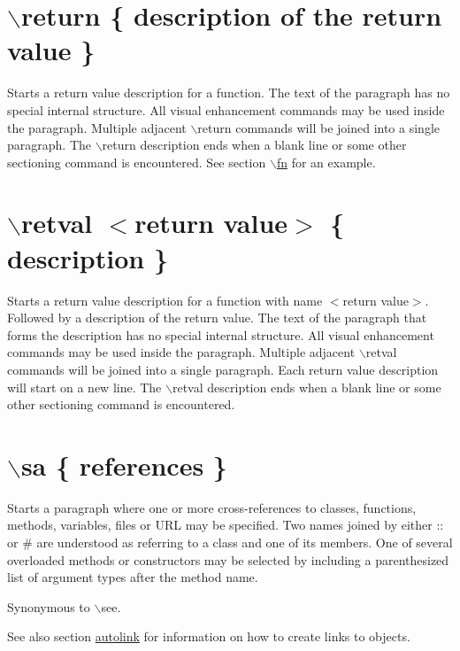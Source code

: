  \hypertarget{commands_cmdreturn}{}\section{$\backslash$return \{ description of the return value \}}\label{commands_cmdreturn}
 Starts a return value description for a function. The text of the paragraph has no special internal structure. All visual enhancement commands may be used inside the paragraph. Multiple adjacent $\backslash$return commands will be joined into a single paragraph. The $\backslash$return description ends when a blank line or some other sectioning command is encountered. See section \hyperlink{commands_cmdfn}{$\backslash$fn} for an example.



 \hypertarget{commands_cmdretval}{}\section{$\backslash$retval $<$return value$>$ \{ description \}}\label{commands_cmdretval}
 Starts a return value description for a function with name $<$return value$>$. Followed by a description of the return value. The text of the paragraph that forms the description has no special internal structure. All visual enhancement commands may be used inside the paragraph. Multiple adjacent $\backslash$retval commands will be joined into a single paragraph. Each return value description will start on a new line. The $\backslash$retval description ends when a blank line or some other sectioning command is encountered.



 \hypertarget{commands_cmdsa}{}\section{$\backslash$sa \{ references \}}\label{commands_cmdsa}
 Starts a paragraph where one or more cross-\/references to classes, functions, methods, variables, files or URL may be specified. Two names joined by either {\ttfamily ::} or {\ttfamily \#} are understood as referring to a class and one of its members. One of several overloaded methods or constructors may be selected by including a parenthesized list of argument types after the method name.

Synonymous to $\backslash$see.

\begin{DoxySeeAlso}{See also}
section \hyperlink{autolink}{autolink} for information on how to create links to objects.
\end{DoxySeeAlso}


